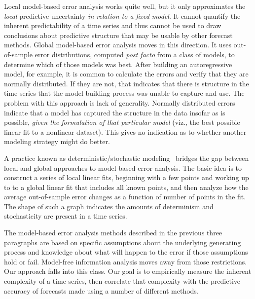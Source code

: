 Local model-based error analysis works quite well, but it only
approximates the \emph{local} predictive uncertainty \emph{in relation
  to a fixed model}.  It cannot quantify the inherent predictability
of a time series and thus cannot be used to draw conclusions about
predictive structure that may be usable by other forecast methods.
%
%
Global model-based error analysis moves in this direction.  It uses
out-of-sample error distributions, computed \emph{post facto} from a
class of models, to determine which of those models was best.  After
building an autoregressive model, for example, it is common to
calculate the errors and verify that they are normally distributed.
If they are not, that indicates that there is structure in the time
series that the model-building process was unable to capture and use.
The problem with this approach is lack of generality.  
\label{page:normal-errors}
Normally distributed errors indicate that a model has captured the
structure in the data insofar as is possible, \emph{given the
  formulation of that particular model} (viz., the best possible
linear fit to a nonlinear dataset).  This gives no indication as to
whether another modeling strategy might do better.


A practice known as deterministic/sto\-chas\-tic
modeling~\cite{Casdagli92dvsplots, weigend-book} bridges the gap
between local and global approaches to model-based error analysis.
The basic idea is to construct a series of local linear fits,
beginning with a few points and working up to to a global linear fit
that includes all known points, and then analyze how the average
out-of-sample error changes as a function of number of points in the
fit. The shape of such a graph indicates the amounts of determinism
and stochasticity are present in a time series.

The model-based error analysis methods described in the previous three
paragraphs are based on specific assumptions about the underlying
generating process and knowledge about what will happen to the error
if those assumptions hold or fail.  Model-free information analysis
moves away from those restrictions.  Our approach falls into this
class.  Our goal is to empirically measure the inherent complexity of
a time series, then correlate that complexity with the predictive
accuracy of forecasts made using a number of different methods.  

